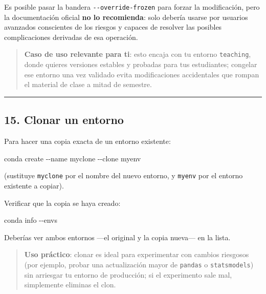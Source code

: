 \documentclass[
  doc,
  floatsintext,
  longtable,
  a4paper,
  nolmodern,
  notxfonts,
  notimes,
  12pt,
  colorlinks=true,linkcolor=blue,citecolor=blue,urlcolor=blue]{apa7}
\newenvironment{Shaded}{\begin{snugshade}}{\end{snugshade}}
\newcommand{\AttributeTok}[1]{\textcolor[rgb]{0.40,0.45,0.13}{#1}}
\newcommand{\ExtensionTok}[1]{\textcolor[rgb]{0.00,0.23,0.31}{#1}}
\newcommand{\NormalTok}[1]{\textcolor[rgb]{0.00,0.23,0.31}{#1}}
\begin{document}
Es posible pasar la bandera \texttt{-\/-override-frozen} para forzar la
modificación, pero la documentación oficial \textbf{no lo recomienda}:
solo debería usarse por usuarios avanzados conscientes de los riesgos y
capaces de resolver las posibles complicaciones derivadas de esa
operación.

\begin{quote}
\textbf{Caso de uso relevante para ti}: esto encaja con tu entorno
\texttt{teaching}, donde quieres versiones estables y probadas para tus
estudiantes; congelar ese entorno una vez validado evita modificaciones
accidentales que rompan el material de clase a mitad de semestre.
\end{quote}

\begin{center}\rule{0.5\linewidth}{0.5pt}\end{center}

\subsection{15. Clonar un entorno}\label{clonar-un-entorno}

Para hacer una copia exacta de un entorno existente:

\begin{Shaded}
\begin{Highlighting}[]
\ExtensionTok{conda}\NormalTok{ create }\AttributeTok{{-}{-}name}\NormalTok{ myclone }\AttributeTok{{-}{-}clone}\NormalTok{ myenv}
\end{Highlighting}
\end{Shaded}

(sustituye \texttt{myclone} por el nombre del nuevo entorno, y
\texttt{myenv} por el entorno existente a copiar).

Verificar que la copia se haya creado:

\begin{Shaded}
\begin{Highlighting}[]
\ExtensionTok{conda}\NormalTok{ info }\AttributeTok{{-}{-}envs}
\end{Highlighting}
\end{Shaded}

Deberías ver ambos entornos ---el original y la copia nueva--- en la
lista.

\begin{quote}
\textbf{Uso práctico}: clonar es ideal para experimentar con cambios
riesgosos (por ejemplo, probar una actualización mayor de
\texttt{pandas} o \texttt{statsmodels}) sin arriesgar tu entorno de
producción; si el experimento sale mal, simplemente eliminas el clon.
\end{quote}
\end{document}
